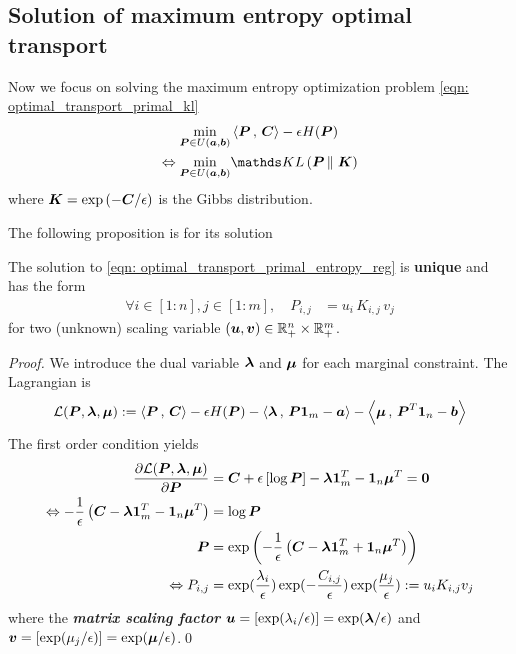 \documentclass[11pt]{article}
\begin{document}
\subsection{Solution of maximum entropy optimal transport}
Now we focus on solving the maximum entropy optimization problem \eqref{eqn: optimal_transport_primal_kl}
\begin{align*}
\min_{\mb{P} \in U(\mb{a}, \mb{b})} & \inn{\mb{P}}{\mb{C}} - \epsilon H(\mb{P}) \\
\Leftrightarrow \min_{\mb{P} \in U(\mb{a}, \mb{b})} & \kl{\mb{P}}{\mb{K}}
\end{align*} where $\boldsymbol{K} = \exp\left(-\boldsymbol{C}/\epsilon\right)$ is the Gibbs distribution. 

The following proposition is for its solution
\begin{proposition}\label{proposition: optimal_max_entropy_primal} \citep{gabriel2019computational}
The solution to \eqref{eqn: optimal_transport_primal_entropy_reg} is \textbf{unique} and has the form
\begin{align}
\forall i\in [1:n], j\in [1:m], \quad P_{i,j} &= u_{i}\,K_{i,j}\,v_{j} \label{eqn: optimal_transport_primal_kl_sol}
\end{align} for two (unknown) scaling variable $(\boldsymbol{u}, \boldsymbol{v}) \in {\mathbb R}_{+}^{n} \times {\mathbb R}_{+}^{m}$.
\end{proposition}
\begin{proof}
We introduce the dual variable $\boldsymbol{\lambda}$ and $\boldsymbol{\mu}$ for each marginal constraint. The Lagrangian is 
\begin{align*}
{\mathcal L}(\boldsymbol{P}, \boldsymbol{\lambda}, \boldsymbol{\mu}) := \left\langle \boldsymbol{P}\,,\, \boldsymbol{C} \right\rangle - \epsilon H(\boldsymbol{P}) - \left\langle \boldsymbol{\lambda}\,,\, \boldsymbol{P}\boldsymbol{1}_{m} - \boldsymbol{a} \right\rangle - \left\langle \boldsymbol{\mu}\,,\, \boldsymbol{P}^{T}\boldsymbol{1}_{n} - \boldsymbol{b} \right\rangle
\end{align*} The first order condition yields
\begin{align*}
\frac{\partial {\mathcal L}(\boldsymbol{P}, \boldsymbol{\lambda}, \boldsymbol{\mu}) }{ \partial \boldsymbol{P}} &= \boldsymbol{C} + \epsilon \left[\log \boldsymbol{P} \right] - \boldsymbol{\lambda}\boldsymbol{1}_{m}^{T} - \boldsymbol{1}_{n}\boldsymbol{\mu}^{T} =\boldsymbol{0} \\
\Leftrightarrow -\frac{1}{\epsilon}\left(\boldsymbol{C} -  \boldsymbol{\lambda}\boldsymbol{1}_{m}^{T} - \boldsymbol{1}_{n}\boldsymbol{\mu}^{T}\right)  &= \log \boldsymbol{P} \\
\boldsymbol{P} &= \exp\left(-\frac{1}{\epsilon}\left(\boldsymbol{C} -  \boldsymbol{\lambda}\boldsymbol{1}_{m}^{T} + \boldsymbol{1}_{n}\boldsymbol{\mu}^{T}\right)\right) \\
\Leftrightarrow P_{i,j}&= \exp(\frac{\lambda_i}{\epsilon})\exp(-\frac{C_{i,j}}{\epsilon})\exp(\frac{\mu_j}{\epsilon}) := u_i K_{i,j} v_{j}
\end{align*} where the \textbf{\emph{matrix scaling factor}} $\boldsymbol{u} = [\exp(\lambda_i / \epsilon)] = \exp(\boldsymbol{\lambda}/\epsilon)$ and $\boldsymbol{v} =  [\exp(\mu_j / \epsilon)] = \exp(\boldsymbol{\mu}/\epsilon)$.\qed
\end{proof}
\end{document}
